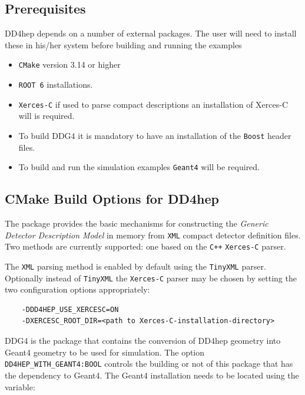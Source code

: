 \subsection{Prerequisites}
\label{sec:dd4hep-user-manual-prerequisites}

DD4hep depends on a number of external packages. The user will need to install these in his/her system before building and running the examples
\begin{itemize}
\item \texttt{CMake} version 3.14 or higher
\item \texttt{ROOT 6} installations.
\item \texttt{Xerces-C} if used to parse compact descriptions an installation of {Xerces-C} will is required.
\item To build DDG4 it is mandatory to have an installation of the \texttt{Boost} header files.
\item To build and run the simulation examples \texttt{Geant4} will be required. 
\end{itemize}

\subsection{CMake Build Options for DD4hep}
\label{sec:dd4hep-user-manual-building}

The package provides the basic mechanisms for constructing the \textit{Generic Detector Description Model} in memory from \texttt{XML} compact detector definition files. Two methods are currently supported: one based
on the \texttt{C++} \texttt{Xerces-C} parser.

The \texttt{XML} parsing method is enabled by default using the \texttt{TinyXML} parser. Optionally instead of \texttt{TinyXML} the \texttt{Xerces-C}  parser may be chosen by setting the two configuration options appropriately:

\begin{verbatim}
    -DDD4HEP_USE_XERCESC=ON
    -DXERCESC_ROOT_DIR=<path to Xerces-C-installation-directory>
\end{verbatim}

DDG4 is the package that contains the conversion of DD4hep geometry into Geant4 geometry to be used for simulation. The option \texttt{DD4HEP\_WITH\_GEANT4:BOOL} controls the building or not of this package that has the dependency to Geant4. The Geant4 installation needs to be located using the variable:

